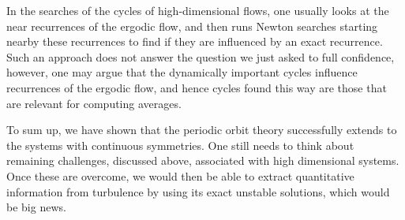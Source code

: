 In the searches of the cycles of high-dimensional flows, one usually looks at
the near recurrences of the ergodic flow, and then runs Newton searches
starting nearby these recurrences to find if they are influenced by an exact
recurrence. Such an approach does not answer the question we just asked to full
confidence, however, one may argue that the dynamically important cycles
influence recurrences of the ergodic flow, and hence cycles found this way are
those that are relevant for computing averages.

To sum up, we have shown that the periodic orbit theory successfully extends to
the systems with continuous symmetries. One still needs to think about
remaining challenges, discussed above, associated with high
dimensional systems. Once these are overcome, we would then be able to extract
quantitative information from turbulence by using its exact unstable solutions,
which would be big news.

